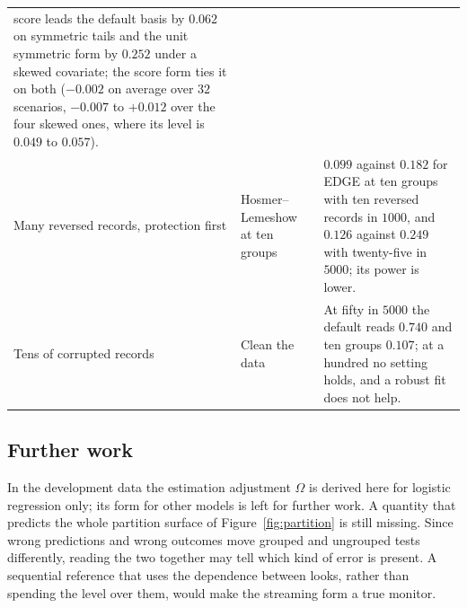 \begin{table}[htbp]
\begin{tabular}{>{\raggedright\arraybackslash}p{}>{\raggedright\arraybackslash}p{}>{\raggedright\arraybackslash}p{}}
score leads the default basis by $0.062$ on symmetric tails and the unit symmetric form by $0.252$ under
a skewed covariate; the score form ties it on both ($-0.002$ on average over $32$ scenarios, $-0.007$
to $+0.012$ over the four skewed ones, where its level is $0.049$ to $0.057$). \\
Many reversed records, protection first & Hosmer--Lemeshow at ten groups & $0.099$ against $0.182$ for
EDGE at ten groups with ten reversed records in $1000$, and $0.126$ against $0.249$ with
twenty-five in $5000$; its power is lower. \\
Tens of corrupted records & Clean the data & At fifty in $5000$ the default reads $0.740$ and ten groups
$0.107$; at a hundred no setting holds, and a robust fit does not help. \\
\bottomrule
\end{tabular}
\end{table}

\subsection{Further work}\label{sec:limits}

In the development data the estimation adjustment $\Omega$ is derived here for logistic regression
only; its form for other models is left for further work. A quantity that predicts the whole partition
surface of Figure~\ref{fig:partition} is still missing. Since wrong predictions and wrong outcomes move
grouped and ungrouped tests differently, reading the two together may tell which kind of error is
present. A sequential reference that uses the dependence between looks, rather than spending the level
over them, would make the streaming form a true monitor.
